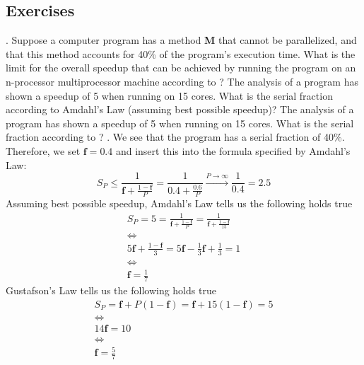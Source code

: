 \documentclass[main.tex]{subfiles}
\begin{document}
\pagebreak

\subsection{Exercises}

\begin{ExerciseList}
    \Exercise[title={Amdahl's Law, Gustafson's Law, Performance},label=AGL].
        \Question Suppose a computer program has a method \textbf{M} that cannot be parallelized, and that this method accounts for 40\% of the program’s execution time. What is the limit for the overall speedup that can be achieved by running the program on an n-processor multiprocessor machine according to ?
        \Question The analysis of a program has shown a speedup of 5 when running on 15 cores. What is the serial fraction according to Amdahl's Law (assuming best possible speedup)?
        \Question The analysis of a program has shown a speedup of 5 when running on 15 cores. What is the serial fraction according to ?
    \Answer[ref={AGL}].
        \Question We see that the program has a serial fraction of 40\%. Therefore, we set $\mathbf{f} = 0.4$ and insert this into the formula specified by Amdahl's Law:
            \begin{equation*}
                S_P \leq \frac{1}{\mathbf{f} + \frac{1-\mathbf{f}}{P}} = \frac{1}{0.4 + \frac{0.6}{P}} \xrightarrow{P \rightarrow \infty} \frac{1}{0.4} = 2.5
            \end{equation*}
        \Question Assuming best possible speedup, Amdahl's Law tells us the following holds true
            \begin{gather*}
                S_P = 5 = \frac{1}{\mathbf{f}+\frac{1-\mathbf{f}}{P}} = \frac{1}{\mathbf{f}+\frac{1-\mathbf{f}}{15}} \\
                \Longleftrightarrow\\
                5 \mathbf{f} + \frac{1-\mathbf{f}}{3} = 5 \mathbf{f} - \frac{1}{3} \mathbf{f} + \frac{1}{3} = 1\\
                \Longleftrightarrow\\
                \mathbf{f} = \frac{1}{7}
            \end{gather*}
        \Question Gustafson's Law tells us the following holds true
            \begin{gather*}
                S_P = \mathbf{f} + P (1 - \mathbf{f})
                    = \mathbf{f} + 15 (1 - \mathbf{f})
                    = 5 \\
                \Longleftrightarrow\\
                14 \mathbf{f} = 10\\
                \Longleftrightarrow\\
                \mathbf{f} = \frac{5}{7}
            \end{gather*}
        

\end{ExerciseList}
\end{document}
